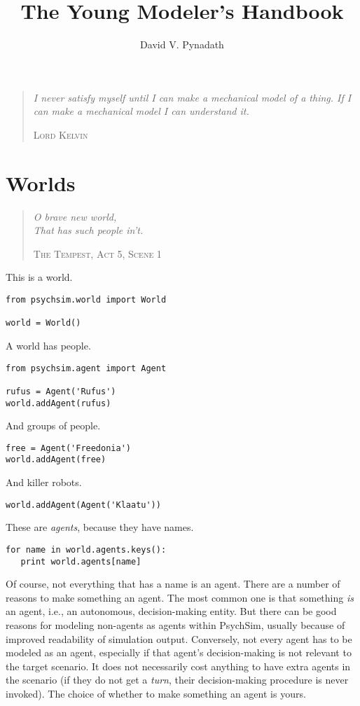 \documentclass{article}
\title{The Young Modeler's Handbook}
\author{David V. Pynadath}
\begin{document}
\maketitle
\begin{quotation}
\noindent
\textit{I never satisfy myself until I can make a mechanical model of a thing. If I can make a mechanical model I can understand it.}

\hfill \textsc{Lord Kelvin}
\end{quotation}
\clearpage
\section{Worlds}
\begin{quotation}
\noindent\textit{O brave new world,\\
That has such people in't.}

\hfill\textsc{The Tempest, Act 5, Scene 1}
\end{quotation}

This is a world.

\begin{verbatim}
from psychsim.world import World

world = World()
\end{verbatim}

A world has people.

\begin{verbatim}
from psychsim.agent import Agent

rufus = Agent('Rufus')
world.addAgent(rufus)
\end{verbatim}

And groups of people.

\begin{verbatim}
free = Agent('Freedonia')
world.addAgent(free)
\end{verbatim}

And killer robots.

\begin{verbatim}
world.addAgent(Agent('Klaatu'))
\end{verbatim}

These are \textit{agents}, because they have names.

\begin{verbatim}
for name in world.agents.keys():
   print world.agents[name]
\end{verbatim}

Of course, not everything that has a name is an agent. There are a number of reasons to make something an agent. The most common one is that something {\em is} an agent, i.e., an autonomous, decision-making entity. But there can be good reasons for modeling non-agents as agents within PsychSim, usually because of improved readability of simulation output. Conversely, not every agent has to be modeled as an agent, especially if that agent's decision-making is not relevant to the target scenario. It does not necessarily cost anything to have extra agents in the scenario (if they do not get a {\em turn}, their decision-making procedure is never invoked). The choice of whether to make something an agent is yours.
\end{document}
